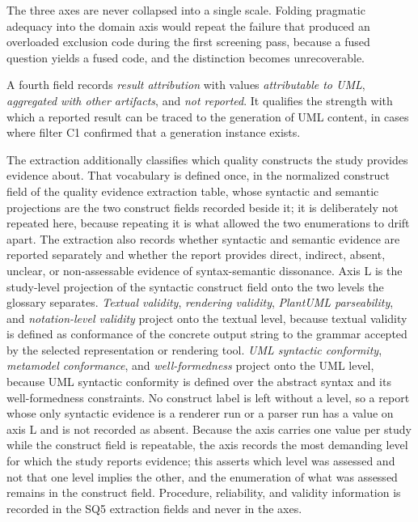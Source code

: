 The three axes are never collapsed into a single scale. Folding pragmatic adequacy into the domain axis would repeat the failure that produced an overloaded exclusion code during the first screening pass, because a fused question yields a fused code, and the distinction becomes unrecoverable.

A fourth field records \textit{result attribution} with values \textit{attributable to UML}, \textit{aggregated with other artifacts}, and \textit{not reported}. It qualifies the strength with which a reported result can be traced to the generation of UML content, in cases where filter C1 confirmed that a generation instance exists.

The extraction additionally classifies which quality constructs the study provides evidence about. That vocabulary is defined once, in the normalized construct field of the quality evidence extraction table, whose syntactic and semantic projections are the two construct fields recorded beside it; it is deliberately not repeated here, because repeating it is what allowed the two enumerations to drift apart. The extraction also records whether syntactic and semantic evidence are reported separately and whether the report provides direct, indirect, absent, unclear, or non-assessable evidence of syntax-semantic dissonance. Axis L is the study-level projection of the syntactic construct field onto the two levels the glossary separates. \textit{Textual validity}, \textit{rendering validity}, \textit{PlantUML parseability}, and \textit{notation-level validity} project onto the textual level, because textual validity is defined as conformance of the concrete output string to the grammar accepted by the selected representation or rendering tool. \textit{UML syntactic conformity}, \textit{metamodel conformance}, and \textit{well-formedness} project onto the UML level, because UML syntactic conformity is defined over the abstract syntax and its well-formedness constraints. No construct label is left without a level, so a report whose only syntactic evidence is a renderer run or a parser run has a value on axis L and is not recorded as absent. Because the axis carries one value per study while the construct field is repeatable, the axis records the most demanding level for which the study reports evidence; this asserts which level was assessed and not that one level implies the other, and the enumeration of what was assessed remains in the construct field. Procedure, reliability, and validity information is recorded in the SQ5 extraction fields and never in the axes.

